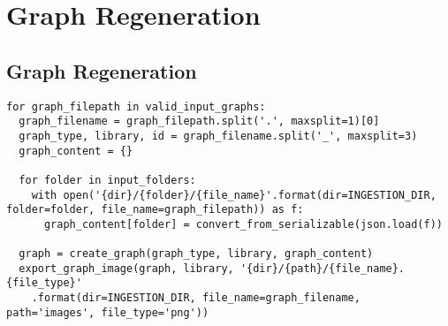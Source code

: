 \chapter[Graph Regeneration]{Graph Regeneration}
\label{AppendixB}

\lstset{
basicstyle=\small\ttfamily,
columns=flexible,
breaklines=true
}

\section{Graph Regeneration}
\begin{lstlisting}
for graph_filepath in valid_input_graphs:
  graph_filename = graph_filepath.split('.', maxsplit=1)[0]
  graph_type, library, id = graph_filename.split('_', maxsplit=3)
  graph_content = {}
  
  for folder in input_folders:
    with open('{dir}/{folder}/{file_name}'.format(dir=INGESTION_DIR, folder=folder, file_name=graph_filepath)) as f:
      graph_content[folder] = convert_from_serializable(json.load(f))
  
  graph = create_graph(graph_type, library, graph_content)
  export_graph_image(graph, library, '{dir}/{path}/{file_name}.{file_type}'
    .format(dir=INGESTION_DIR, file_name=graph_filename, path='images', file_type='png'))
\end{lstlisting}